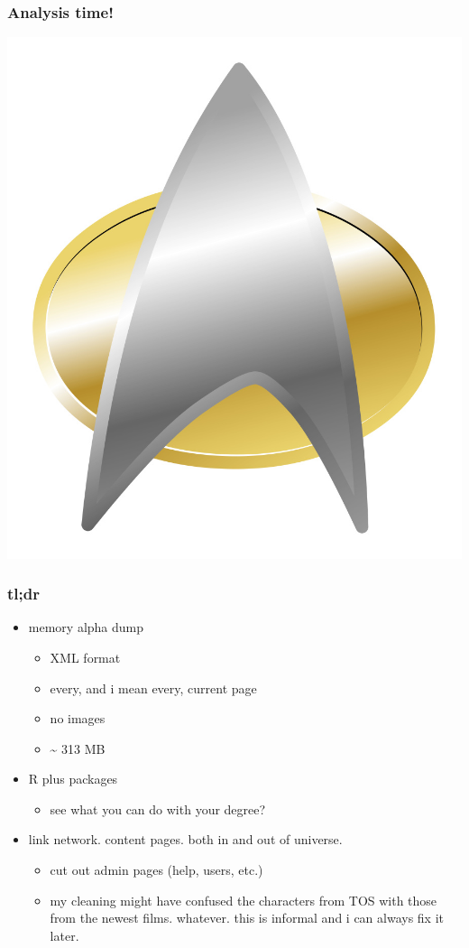 \documentclass{beamer}
\begin{document}
\begin{frame}
  \frametitle{Analysis time!}
  \begin{center}
    \includegraphics[height = 0.8\textheight, width = \textwidth, keepaspectratio = true]{figure/star-trek-insignia}
  \end{center}
\end{frame}

\begin{frame}
  \frametitle{tl;dr}
  \begin{itemize}
    \item memory alpha dump
      \begin{itemize}
        \item XML format
        \item every, and i mean every, current page
        \item no images
        \item \~{} 313 MB
      \end{itemize}
    \item R plus packages
      \begin{itemize}
        \item see what you can do with your degree?
      \end{itemize}
    \item link network. content pages. both in and out of universe.
      \begin{itemize}
        \item cut out admin pages (help, users, etc.)
        \item my cleaning might have confused the characters from TOS with those from the newest films. whatever. this is informal and i can always fix it later. 
      \end{itemize}
  \end{itemize}
\end{frame}
\end{document}
